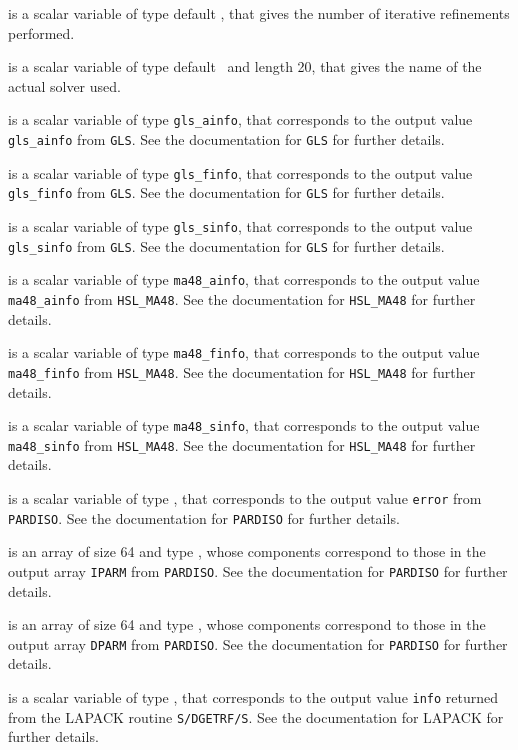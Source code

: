 \documentclass{galahad}
\begin{document}
\begin{description}
 is a scalar variable of type default \integer,
that gives the number of iterative refinements performed.

 is a scalar variable of type default \character\
and length 20, that  gives the name of the actual solver used.

 is a scalar variable of type {\tt gls\_ainfo},
that corresponds to the output value {\tt gls\_ainfo}
from {\tt GLS}. See the documentation for {\tt GLS} for further
details.

 is a scalar variable of type {\tt gls\_finfo},
that corresponds to the output value {\tt gls\_finfo}
from {\tt GLS}. See the documentation for {\tt GLS} for further
details.

 is a scalar variable of type {\tt gls\_sinfo},
that corresponds to the output value {\tt gls\_sinfo}
from {\tt GLS}. See the documentation for {\tt GLS} for further
details.

 is a scalar variable of type {\tt ma48\_ainfo},
that corresponds to the output value {\tt ma48\_ainfo}
from {\tt HSL\_MA48}. See the documentation for {\tt HSL\_MA48} for further
details.

 is a scalar variable of type {\tt ma48\_finfo},
that corresponds to the output value {\tt ma48\_finfo}
from {\tt HSL\_MA48}. See the documentation for {\tt HSL\_MA48} for further
details.

 is a scalar variable of type {\tt ma48\_sinfo},
that corresponds to the output value {\tt ma48\_sinfo}
from {\tt HSL\_MA48}. See the documentation for {\tt HSL\_MA48} for further
details.

 is a scalar variable of type \integer,
that corresponds to the output value {\tt error}
from {\tt PARDISO}. See the documentation for {\tt PARDISO} for further
details.

 is an array of size 64 and type \integer,
whose components correspond to those in the output array {\tt IPARM}
from {\tt PARDISO}. See the documentation for {\tt PARDISO} for further
details.

 is an array of size 64 and type \realdp,
whose components correspond to those in the output array {\tt DPARM}
from {\tt PARDISO}. See the documentation for {\tt PARDISO} for further
details.

 is a scalar variable of type \integer,
that corresponds to the output value {\tt info} returned from
the LAPACK routine {\tt S/DGETRF/S}.
See the documentation for LAPACK for further details.

\end{description}
\end{document}
